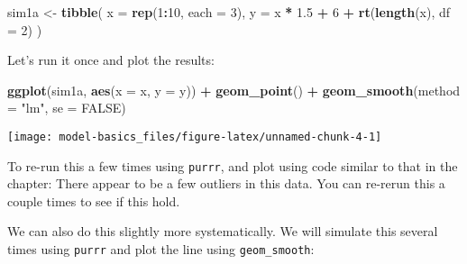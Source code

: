 \documentclass[]{book}
\newenvironment{Shaded}{\begin{snugshade}}{\end{snugshade}}
\newcommand{\DataTypeTok}[1]{\textcolor[rgb]{0.13,0.29,0.53}{#1}}
\newcommand{\DecValTok}[1]{\textcolor[rgb]{0.00,0.00,0.81}{#1}}
\newcommand{\FloatTok}[1]{\textcolor[rgb]{0.00,0.00,0.81}{#1}}
\newcommand{\KeywordTok}[1]{\textcolor[rgb]{0.13,0.29,0.53}{\textbf{#1}}}
\newcommand{\NormalTok}[1]{#1}
\newcommand{\OperatorTok}[1]{\textcolor[rgb]{0.81,0.36,0.00}{\textbf{#1}}}
\newcommand{\OtherTok}[1]{\textcolor[rgb]{0.56,0.35,0.01}{#1}}
\newcommand{\StringTok}[1]{\textcolor[rgb]{0.31,0.60,0.02}{#1}}
\theoremstyle{plain}
\theoremstyle{remark}
\theoremstyle{definition}
\theoremstyle{definition}
\theoremstyle{definition}
\theoremstyle{remark}
\begin{document}
\begin{Shaded}
\begin{Highlighting}[]
\NormalTok{sim1a <-}\StringTok{ }\KeywordTok{tibble}\NormalTok{(}
  \DataTypeTok{x =} \KeywordTok{rep}\NormalTok{(}\DecValTok{1}\OperatorTok{:}\DecValTok{10}\NormalTok{, }\DataTypeTok{each =} \DecValTok{3}\NormalTok{),}
  \DataTypeTok{y =}\NormalTok{ x }\OperatorTok{*}\StringTok{ }\FloatTok{1.5} \OperatorTok{+}\StringTok{ }\DecValTok{6} \OperatorTok{+}\StringTok{ }\KeywordTok{rt}\NormalTok{(}\KeywordTok{length}\NormalTok{(x), }\DataTypeTok{df =} \DecValTok{2}\NormalTok{)}
\NormalTok{)}
\end{Highlighting}
\end{Shaded}

Let's run it once and plot the results:

\begin{Shaded}
\begin{Highlighting}[]
\KeywordTok{ggplot}\NormalTok{(sim1a, }\KeywordTok{aes}\NormalTok{(}\DataTypeTok{x =}\NormalTok{ x, }\DataTypeTok{y =}\NormalTok{ y)) }\OperatorTok{+}
\StringTok{  }\KeywordTok{geom_point}\NormalTok{() }\OperatorTok{+}
\StringTok{  }\KeywordTok{geom_smooth}\NormalTok{(}\DataTypeTok{method =} \StringTok{"lm"}\NormalTok{, }\DataTypeTok{se =} \OtherTok{FALSE}\NormalTok{)}
\end{Highlighting}
\end{Shaded}

\begin{center}\texttt{[image: model-basics\_files/figure-latex/unnamed-chunk-4-1]} \end{center}

To re-run this a few times using \texttt{purrr}, and plot using code
similar to that in the chapter: There appear to be a few outliers in
this data. You can re-rerun this a couple times to see if this hold.

We can also do this slightly more systematically. We will simulate this
several times using \texttt{purrr} and plot the line using
\texttt{geom\_smooth}:
\end{document}
